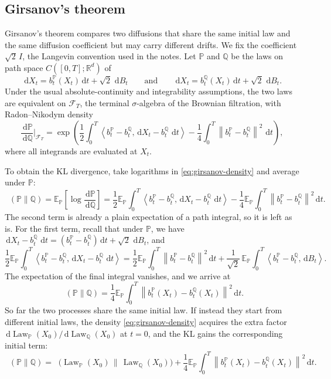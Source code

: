 \documentclass{amsart}
\numberwithin{equation}{section}
\theoremstyle{plain}
\theoremstyle{definition}
\theoremstyle{remark}
\DeclareMathOperator{\KL}{D_{\mathsf{KL}}}
\DeclareMathOperator{\Law}{Law}
\newcommand{\R}{\mathbb{R}}
\newcommand{\E}{\mathbb{E}}
\newcommand{\Pp}{\mathbb{P}}
\newcommand{\dd}{\,\mathrm{d}}
\newcommand{\Id}{I}
\newcommand{\cF}{\mathcal{F}}
\newcommand{\norm}[1]{\left\lVert #1 \right\rVert}
\newcommand{\ip}[2]{\left\langle #1,#2 \right\rangle}
\begin{document}
\subsection*{Girsanov's theorem}

Girsanov's theorem compares two diffusions that share the same initial law and
the same diffusion coefficient but may carry different drifts.  We fix the
coefficient $\sqrt2\,\Id$, the Langevin convention used in the notes.  Let $\Pp$
and $\mathbb{Q}$ be the laws on path space $C([0,T];\R^d)$ of
\[
    \dd X_t=b^\Pp_t(X_t)\dd t+\sqrt2\,\dd B_t
    \qquad\text{and}\qquad
    \dd X_t=b^{\mathbb{Q}}_t(X_t)\dd t+\sqrt2\,\dd B_t.
\]
Under the usual absolute-continuity and integrability assumptions, the two laws
are equivalent on $\cF_T$, the terminal $\sigma$-algebra of the Brownian filtration, with Radon--Nikodym density
\begin{equation}\label{eq:girsanov-density}
    \frac{\dd \Pp}{\dd \mathbb{Q}}\bigg|_{\cF_T}
    =
    \exp\!\left(
    \frac12\int_0^T \ip{b^\Pp_t-b^{\mathbb{Q}}_t}{\dd X_t-b^{\mathbb{Q}}_t\,\dd t}
    -
    \frac14\int_0^T \norm{b^\Pp_t-b^{\mathbb{Q}}_t}^2\,\dd t
    \right),
\end{equation}
where all integrands are evaluated at $X_t$.

To obtain the KL divergence, take logarithms in \eqref{eq:girsanov-density} and
average under $\Pp$:
\[
    \KL(\Pp\|\mathbb{Q})
    =
    \E_\Pp\!\left[\log\frac{\dd \Pp}{\dd \mathbb{Q}}\right]
    =
    \frac12\E_\Pp\int_0^T \ip{b^\Pp_t-b^{\mathbb{Q}}_t}{\dd X_t-b^{\mathbb{Q}}_t\,\dd t}
    -
    \frac14\E_\Pp\int_0^T\norm{b^\Pp_t-b^{\mathbb{Q}}_t}^2\dd t.
\]
The second term is already a plain expectation of a path integral, so it is left
as is.  For the first term, recall that under $\Pp$, we have $\dd X_t-b^{\mathbb{Q}}_t\,\dd t=(b^\Pp_t-b^{\mathbb{Q}}_t)\dd t+\sqrt2\,\dd B_t$, and
\[
    \frac12\E_\Pp\int_0^T \ip{b^\Pp_t-b^{\mathbb{Q}}_t}{\dd X_t-b^{\mathbb{Q}}_t\,\dd t}
    =
    \frac12\E_\Pp\int_0^T\norm{b^\Pp_t-b^{\mathbb{Q}}_t}^2\dd t
    +
    \frac{1}{\sqrt2}\,\E_\Pp\int_0^T\ip{b^\Pp_t-b^{\mathbb{Q}}_t}{\dd B_t}.
\]
The expectation of the final integral vanishes, and we arrive at
\begin{equation}\label{eq:girsanov-kl}
    \KL(\Pp\|\mathbb{Q}) = \frac14 \E_{\Pp}\int_0^T \norm{b^\Pp_t(X_t)-b^{\mathbb{Q}}_t(X_t)}^2\dd t.
\end{equation}
So far the two processes share the same initial law.  If instead they start from
different initial laws, the density \eqref{eq:girsanov-density} acquires the
extra factor $\dd\Law_\Pp(X_0)/\dd\Law_{\mathbb{Q}}(X_0)$ at $t=0$, and the KL gains the
corresponding initial term:
\[
    \KL(\Pp\|\mathbb{Q})
    =
    \KL\bigl(\Law_\Pp(X_0)\,\big\|\,\Law_{\mathbb{Q}}(X_0)\bigr)
    +
    \frac14\E_\Pp\int_0^T\norm{b^\Pp_t(X_t)-b^{\mathbb{Q}}_t(X_t)}^2\dd t.
\]
\end{document}
